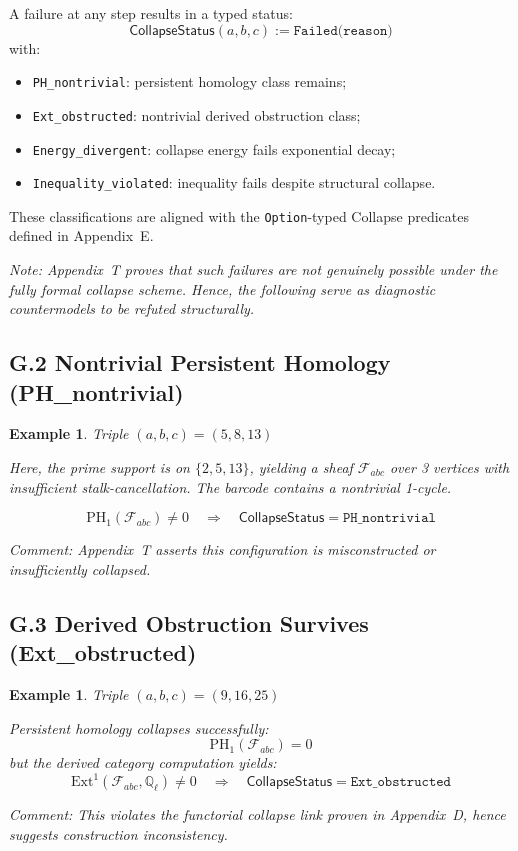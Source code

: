 \documentclass[11pt]{article}
\newtheorem{example}[theorem]{Example}
\begin{document}
A failure at any step results in a typed status:
\[
\mathsf{CollapseStatus}(a,b,c) := \texttt{Failed(reason)}
\]
with:
\begin{itemize}
  \item \texttt{PH\_nontrivial}: persistent homology class remains;
  \item \texttt{Ext\_obstructed}: nontrivial derived obstruction class;
  \item \texttt{Energy\_divergent}: collapse energy fails exponential decay;
  \item \texttt{Inequality\_violated}: inequality fails despite structural collapse.
\end{itemize}

These classifications are aligned with the \texttt{Option}-typed Collapse predicates defined in Appendix~E.

\vspace{1em}
\noindent
\textit{Note: Appendix~T proves that such failures are not genuinely possible under the fully formal collapse scheme.  
Hence, the following serve as diagnostic countermodels to be refuted structurally.}

\subsection*{G.2 Nontrivial Persistent Homology (PH\_nontrivial)}

\begin{example}
Triple \( (a,b,c) = (5,8,13) \)

Here, the prime support is on \( \{2,5,13\} \), yielding a sheaf \( \mathcal{F}_{abc} \) over 3 vertices with insufficient stalk-cancellation.  
The barcode contains a nontrivial 1-cycle.

\[
\mathrm{PH}_1(\mathcal{F}_{abc}) \neq 0 \quad \Rightarrow \quad \mathsf{CollapseStatus} = \texttt{PH\_nontrivial}
\]

\textit{Comment: Appendix~T asserts this configuration is misconstructed or insufficiently collapsed.}
\end{example}

\subsection*{G.3 Derived Obstruction Survives (Ext\_obstructed)}

\begin{example}
Triple \( (a,b,c) = (9,16,25) \)

Persistent homology collapses successfully:
\[
\mathrm{PH}_1(\mathcal{F}_{abc}) = 0
\]
but the derived category computation yields:
\[
\mathrm{Ext}^1(\mathcal{F}_{abc}, \mathbb{Q}_\ell) \neq 0
\quad \Rightarrow \quad \mathsf{CollapseStatus} = \texttt{Ext\_obstructed}
\]

\textit{Comment: This violates the functorial collapse link proven in Appendix~D, hence suggests construction inconsistency.}
\end{example}
\end{document}
